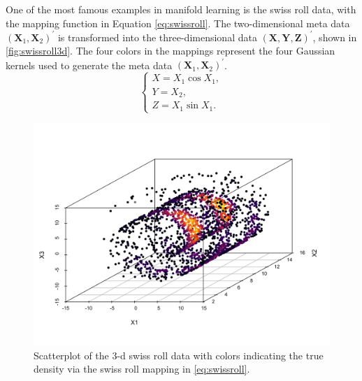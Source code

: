 \documentclass[11pt,a4paper,]{article}
\begin{document}
One of the most famous examples in manifold learning is the swiss roll data, with the mapping function in Equation \eqref{eq:swissroll}. The two-dimensional meta data \((\pmb{X}_1, \pmb{X}_2)^\prime\) is transformed into the three-dimensional data \((\pmb{X}, \pmb{Y}, \pmb{Z})^\prime\), shown in \autoref{fig:swissroll3d}. The four colors in the mappings represent the four Gaussian kernels used to generate the meta data \((\pmb{X}_1, \pmb{X}_2)^\prime\).
\begin{equation}
\label{eq:swissroll}
\left\{
\begin{array}{lcl}
X = X_1 \cos{X_1}, \\
Y = X_2, \\
Z = X_1 \sin{X_1}.
\end{array}
\right.
\end{equation}



\begin{figure}

{\centering \includegraphics[width=0.8\linewidth]{figures/scatterplot3d_swissroll_dc} 

}

\caption{Scatterplot of the 3-d swiss roll data with colors indicating the true density via the swiss roll mapping in \autoref{eq:swissroll}.}\label{fig:swissroll3d}
\end{figure}
\end{document}
